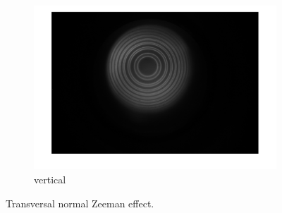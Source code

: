 \documentclass[a4paper,12pt]{article}
\begin{document}
\begin{figure}[H]
\begin{subfigure}[b]{0.3\textwidth}
            \includegraphics[width=1.2\textwidth]{tra_nor_ver.png}
            \caption{vertical}
        \end{subfigure}
        \caption{Transversal normal Zeeman effect.}
        \label{fig:tra_nor}
    \end{figure}
    
\end{document}

